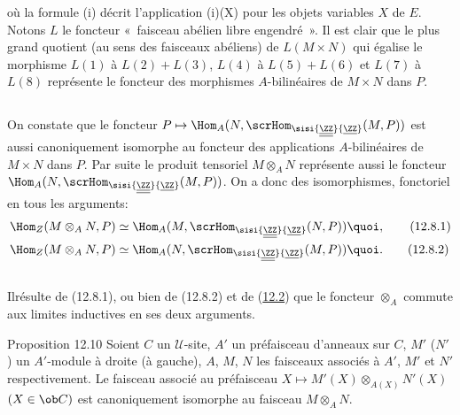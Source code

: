 \documentclass[10pt]{../fichiers-configuration-latex/smfart}
\begin{document}
où la formule (i) décrit l'application (i)(X) pour les objets
variables $X$ de $E$. Notons $L$ le foncteur « faisceau abélien
libre engendré ». Il est clair que le plus grand quotient (au sens
des faisceaux abéliens) de $L(M\times N)$ qui égalise le morphisme
$L(1)$ à $L(2)+L(3)$, $L(4)$ à $L(5)+L(6)$ et $L(7)$ à $L(8)$
représente le foncteur des morphismes $A$-bilinéaires de $M\times N$
dans $P$.

\setcounter{subsection}{7}





\subsection{}
On constate que le foncteur $P\mapsto \Hom_A(N,\scrHom_{\sisi{\underline{\underline{\ZZ}}}{\underline{\ZZ}}}(M,P))$ est
aussi canoniquement isomorphe au foncteur des applications
$A$-bilinéaires de $M\times N$ dans $P$. Par suite le produit
tensoriel $M\otimes_A N$ représente aussi le foncteur
$\Hom_A(N,\scrHom_{\sisi{\underline{\underline{\ZZ}}}{\underline{\ZZ}}}(M,P))$. On a donc des isomorphismes, fonctoriel
en tous les arguments:
\begin{align*}%
\Hom_Z(M\otimes_A N,P) &\simeq \Hom_A(M,\scrHom_{\sisi{\underline{\underline{\ZZ}}}{\underline{\ZZ}}}(N,P)){\quoi},\tag{12.8.1}\\
\Hom_Z(M\otimes_A N,P) &\simeq \Hom_A (N,\scrHom_{\sisi{\underline{\underline{\ZZ}}}{\underline{\ZZ}}}(M,P)){\quoi}.\tag{12.8.2}
\end{align*}

\subsection{}
Il\pageoriginale résulte de (12.8.1), ou bien de
(12.8.2) et de (\hyperref[IV.subsec12.2]{12.2}) que le foncteur
$\otimes_A$ commute aux limites inductives en ses deux arguments.

\begin{enonce*}{Proposition 12.10}
Soient $C$ un $𝒰$-site, $A'$ un préfaisceau d'anneaux sur
$C$, $M'$ (\resp $N'$) un $A'$-module à droite (\resp à gauche),
$A$, $M$, $N$ les faisceaux associés à $A'$, $M'$ et $N'$
respectivement. Le faisceau associé au préfaisceau $X\mapsto
M'(X)\otimes_{A(X)}N'(X)$ $(X\in \ob C)$ est canoniquement isomorphe
au faisceau $M\otimes_A N$.
\end{enonce*}
\end{document}
